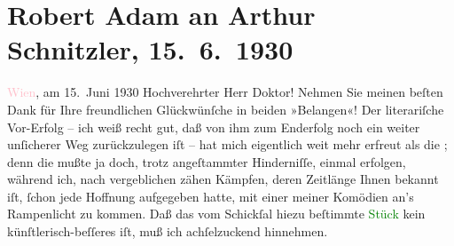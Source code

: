 

               \section[Robert Adam an Arthur Schnitzler, 15. 6. 1930]{ Robert Adam an Arthur Schnitzler, 15. 6. 1930}\nopagebreak{}\rehead{ }\normalsize\beginnumbering{} \toendnotes[C]{\smallbreak\pagebreak[2]} 
\toendnotes[C]{\smallbreak}\pstart
           \raggedleft{}{\pb}\textcolor{pink}{Wien}{}\ledrightnote{\textcolor{pink}{Wien}}, am 15. Juni 1930\pend
           \pstart{}Hochverehrter Herr Doktor!\pend\pstart
           Nehmen Sie meinen beſten Dank für Ihre freundlichen Glückwünſche in beiden
                    »Belangen«!\pend
           \pstart
           Der literariſche Vor-Erfolg – ich weiß recht gut, daß von ihm zum Enderfolg noch
                    ein weiter unſicherer Weg zurückzulegen iſt – hat mich eigentlich weit mehr
                    erfreut als die \label{K_L02538_1v}\label{K_L02538_1h}; denn die mußte ja doch, trotz
                    angeſtammter Hinderniſſe, einmal erfolgen, während ich, nach vergeblichen zähen
                    Kämpfen, deren Zeitlänge Ihnen bekannt iſt, ſchon jede Hoffnung aufgegeben
                    hatte, mit einer meiner Komödien an’s Rampenlicht zu kommen. Daß das vom
                    Schickſal hiezu beſtimmte \textcolor{green}{Stück}{} kein künſtlerisch-beſſeres iſt, muß ich achſelzuckend hinnehmen.
